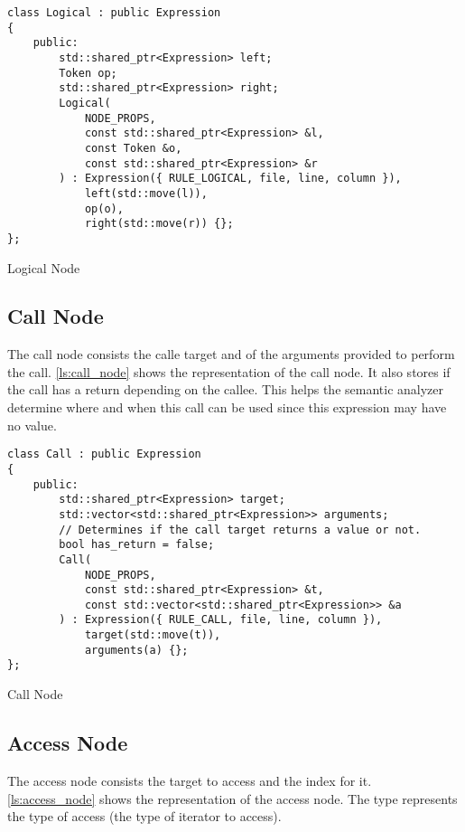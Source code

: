 \begin{listing}[H]
\begin{verbatim}
class Logical : public Expression
{
    public:
        std::shared_ptr<Expression> left;
        Token op;
        std::shared_ptr<Expression> right;
        Logical(
            NODE_PROPS,
            const std::shared_ptr<Expression> &l,
            const Token &o,
            const std::shared_ptr<Expression> &r
        ) : Expression({ RULE_LOGICAL, file, line, column }),
            left(std::move(l)),
            op(o),
            right(std::move(r)) {};
};
\end{verbatim}
\caption{Logical Node}
\label{ls:logical_node}
\end{listing}

\subsection{Call Node}

The call node consists the calle target and of the arguments provided to perform the call.
\autoref{ls:call_node} shows the representation of the call node. It also stores if the call has a return
depending on the callee. This helps the semantic analyzer determine where and when this call can be used since
this expression may have no value.

\begin{listing}[H]
\begin{verbatim}
class Call : public Expression
{
    public:
        std::shared_ptr<Expression> target;
        std::vector<std::shared_ptr<Expression>> arguments;
        // Determines if the call target returns a value or not.
        bool has_return = false;
        Call(
            NODE_PROPS,
            const std::shared_ptr<Expression> &t,
            const std::vector<std::shared_ptr<Expression>> &a
        ) : Expression({ RULE_CALL, file, line, column }),
            target(std::move(t)),
            arguments(a) {};
};
\end{verbatim}
\caption{Call Node}
\label{ls:call_node}
\end{listing}

\subsection{Access Node}

The access node consists the target to access and the index for it.
\autoref{ls:access_node} shows the representation of the access node.
The type represents the type of access (the type of iterator to access).

